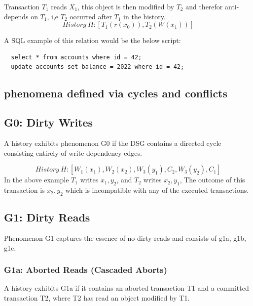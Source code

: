 \documentclass[a4paper,10pt,titlepage]{report}
\begin{document}
\vspace{2mm}

\vspace{2mm}



Transaction $T_1$ reads $X_1$, this object is then modified by $T_2$ and therefor anti-depends on $T_1$, i,e $T_2$ occurred after $T_1$ in the history.
\begin{equation}
    History\ H: [T_1(r(x_0)), T_2(W(x_1))]
\end{equation}


A SQL example of this relation would be the below script:
\begin{lstlisting}
  select * from accounts where id = 42;
  update accounts set balance = 2022 where id = 42;
\end{lstlisting}

\subsection{phenomena defined via cycles and conflicts}

\subsection{G0: Dirty Writes}
A history exhibits phenomenon G0 if the DSG contains a directed cycle consisting entirely of write-dependency edges.



\begin{equation}
    History\ H: [W_1(x_1),W_2(x_2),W_3(y_1),C_2,W_3(y_2),C_1]
\end{equation}
In the above example $T_1$ writes $x_1, y_2$, and $T_2$ writes $x_2, y_1$, The outcome of this transaction is $x_2, y_2$ which is incompatible with any of the executed transactions.

\subsection{G1: Dirty Reads}
Phenomenon G1 captures the essence of no-dirty-reads and consists of g1a, g1b, g1c.

\subsubsection{G1a: Aborted Reads (Cascaded Aborts)}

        A history exhibits G1a if it contains an aborted transaction T1 and a committed transaction T2, where T2 has read an object modified by T1. 
        
        \\
\end{document}
